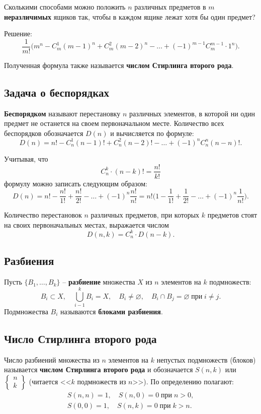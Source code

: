\begin{example}
    Сколькими способами можно положить \(n\) различных предметов в \(m\) \textbf{неразличимых} ящиков так, чтобы в каждом ящике лежат хотя бы один предмет?

    Решение:
    \[
        \frac{1}{m!} \Big( m^n - C_m^1 (m - 1)^n + C_m^2 (m - 2)^n - \ldots + (-1)^{m - 1} C_m^{m - 1} \cdot 1^n \Big).
    \]

    Полученная формула также называется \textbf{числом Стирлинга второго рода}.
\end{example}

\subsection{Задача о беспорядках}

\textbf{Беспорядком} называют перестановку \(n\) различных элементов, в которой ни один предмет не останется на своем первоначальном месте. Количество всех беспорядков обозначается \(D(n)\) и вычисляется по формуле:
\[
    D(n) = n! - C_n^1 (n - 1)! + C_n^2 (n - 2)! - \ldots + (-1)^n C_n^n (n - n)!.
\]

Учитывая, что
\[
    C_n^k \cdot (n - k)! = \frac{n!}{k!}
\]
формулу можно записать следующим образом:
\[
    D(n) =
    n! - \frac{n!}{1!} + \frac{n!}{2!} - \ldots + (-1)^n \frac{n!}{n!} =
    n! \Big( 1 - \frac{1}{1!} + \frac{1}{2!} - \ldots + (-1)^n \frac{1}{n!} \Big).
\]

Количество перестановок \(n\) различных предметов, при которых \(k\) предметов стоят на своих первоначальных местах, выражается числом
\[
    D(n, k) = C_n^k \cdot D(n - k).
\]

\subsection{Разбиения}

Пусть \(\{B_1, \ldots, B_k\}\) -- \textbf{разбиение} множества \(X\) из \(n\) элементов на \(k\) подмножеств:
\[
    B_i \subset X,
    \quad
    \bigcup_{i - 1}^k B_i = X,
    \quad
    B_i \neq \varnothing,
    \quad
    B_i \cap B_j = \varnothing \; \text{при} \; i \neq j.
\]
Подмножества \(B_i\) называются \textbf{блоками разбиения}.

\subsection{Число Стирлинга второго рода}

Число разбиений множества из \(n\) элементов на \(k\) непустых подмножеств (блоков) называется \textbf{числом Стирлинга второго рода} и обозначается \(S(n, k)\) или \(\displaystyle \begin{Bmatrix} n \\ k \end{Bmatrix} \) (читается <<\(k\) подмножеств из \(n\)>>). По определению полагают:
\begin{gather*}
    S(n, n) = 1,
    \quad
    S(n, 0) = 0 \; \text{при} \; n > 0,
    \\
    S(0, 0) = 1,
    \quad
    S(n, k) = 0 \; \text{при} \; k > n.
\end{gather*}

